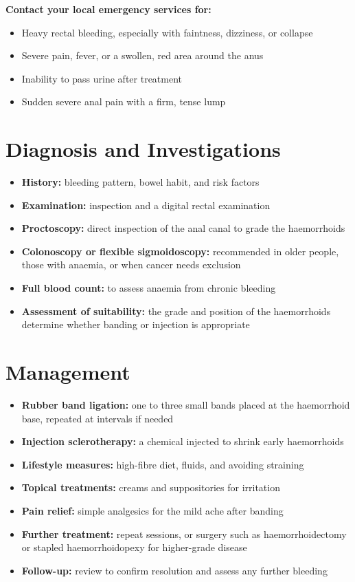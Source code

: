 \textbf{Contact your local emergency services for:}
\begin{itemize}
    \item Heavy rectal bleeding, especially with faintness, dizziness, or collapse
    \item Severe pain, fever, or a swollen, red area around the anus
    \item Inability to pass urine after treatment
    \item Sudden severe anal pain with a firm, tense lump
\end{itemize}

\section*{Diagnosis and Investigations}
\begin{itemize}
    \item \textbf{History:} bleeding pattern, bowel habit, and risk factors
    \item \textbf{Examination:} inspection and a digital rectal examination
    \item \textbf{Proctoscopy:} direct inspection of the anal canal to grade the haemorrhoids
    \item \textbf{Colonoscopy or flexible sigmoidoscopy:} recommended in older people, those with anaemia, or when cancer needs exclusion
    \item \textbf{Full blood count:} to assess anaemia from chronic bleeding
    \item \textbf{Assessment of suitability:} the grade and position of the haemorrhoids determine whether banding or injection is appropriate
\end{itemize}

\section*{Management}
\begin{itemize}
    \item \textbf{Rubber band ligation:} one to three small bands placed at the haemorrhoid base, repeated at intervals if needed
    \item \textbf{Injection sclerotherapy:} a chemical injected to shrink early haemorrhoids
    \item \textbf{Lifestyle measures:} high-fibre diet, fluids, and avoiding straining
    \item \textbf{Topical treatments:} creams and suppositories for irritation
    \item \textbf{Pain relief:} simple analgesics for the mild ache after banding
    \item \textbf{Further treatment:} repeat sessions, or surgery such as haemorrhoidectomy or stapled haemorrhoidopexy for higher-grade disease
    \item \textbf{Follow-up:} review to confirm resolution and assess any further bleeding
\end{itemize}


